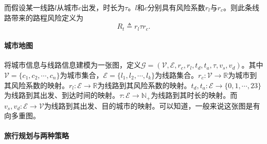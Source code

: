 而假设某一线路$l$从城市$c$出发，时长为$\tau$。$l$和$c$分别具有风险系数$r_l$与$r_c$。则此条线路带来的路程风险定义为
\begin{equation}
  R_t \triangleq r_l \tau r_c.
\end{equation}

\paragraph{城市地图}

将城市信息与线路信息建模为一张图，定义$\mathcal G = (\mathcal V, \mathcal E, r_c, r_l, t_d, t_a, \tau, v_s, v_d)$。其中$\mathcal V = \{ c_1, c_2, \cdots, c_n \}$为城市集合，$\mathcal E = \{ l_1, l_2, \cdots, l_k \}$为线路集合。$r_c : \mathcal V \rightarrow \mathds R$为城市到其风险系数的映射。$r_l : \mathcal E \rightarrow \mathds R$为线路到其风险系数的映射。$t_d, t_a : \mathcal E \rightarrow \{ 0, 1, \cdots, 23 \}$为线路到其出发、到达时间的映射。$\tau : \mathcal E \rightarrow \mathds N_+$为线路到其时长的映射。而$v_s, v_d : \mathcal E \rightarrow \mathcal V$为线路到其出发、目的城市的映射。可以知道，一般来说这张图是有向多重图。

\paragraph{旅行规划与两种策略}

